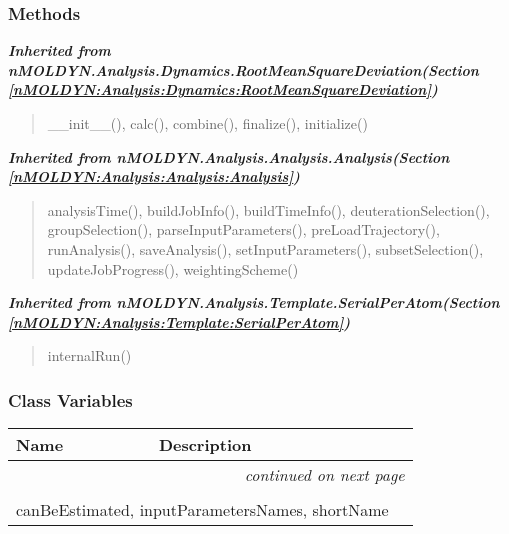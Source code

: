 
  \subsubsection{Methods}


\large{\textbf{\textit{Inherited from nMOLDYN.Analysis.Dynamics.RootMeanSquareDeviation\textit{(Section \ref{nMOLDYN:Analysis:Dynamics:RootMeanSquareDeviation})}}}}

\begin{quote}
\_\_init\_\_(), calc(), combine(), finalize(), initialize()
\end{quote}

\large{\textbf{\textit{Inherited from nMOLDYN.Analysis.Analysis.Analysis\textit{(Section \ref{nMOLDYN:Analysis:Analysis:Analysis})}}}}

\begin{quote}
analysisTime(), buildJobInfo(), buildTimeInfo(), deuterationSelection(), groupSelection(), parseInputParameters(), preLoadTrajectory(), runAnalysis(), saveAnalysis(), setInputParameters(), subsetSelection(), updateJobProgress(), weightingScheme()
\end{quote}

\large{\textbf{\textit{Inherited from nMOLDYN.Analysis.Template.SerialPerAtom\textit{(Section \ref{nMOLDYN:Analysis:Template:SerialPerAtom})}}}}

\begin{quote}
internalRun()
\end{quote}


  \subsubsection{Class Variables}

    \vspace{-1cm}
\hspace{\varindent}\begin{longtable}{|p{\varnamewidth}|p{\vardescrwidth}|l}
\cline{1-2}
\cline{1-2} \centering \textbf{Name} & \centering \textbf{Description}& \\
\cline{1-2}
\endhead\cline{1-2}\multicolumn{3}{r}{\small\textit{continued on next page}}\\\endfoot\cline{1-2}
\endlastfoot\multicolumn{2}{|l|}{\textit{Inherited from nMOLDYN.Analysis.Dynamics.RootMeanSquareDeviation \textit{(Section \ref{nMOLDYN:Analysis:Dynamics:RootMeanSquareDeviation})}}}\\
\multicolumn{2}{|p{\varwidth}|}{\raggedright canBeEstimated, inputParametersNames, shortName}\\
\cline{1-2}
\end{longtable}

